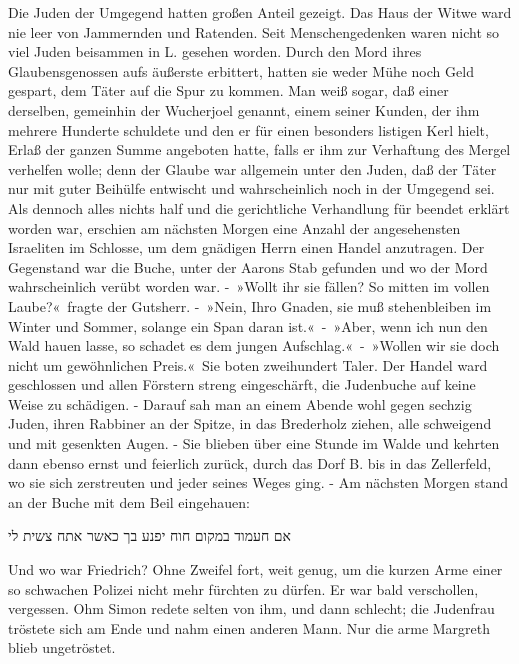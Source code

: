 Die Juden der Umgegend hatten großen Anteil gezeigt. Das Haus der Witwe ward nie leer von Jammernden und Ratenden. Seit Menschengedenken waren nicht so viel Juden beisammen in L. gesehen worden. Durch den Mord ihres Glaubensgenossen aufs äußerste erbittert, hatten sie weder Mühe noch Geld gespart, dem Täter auf die Spur zu kommen. Man weiß sogar, daß einer derselben, gemeinhin der Wucherjoel genannt, einem seiner Kunden, der ihm mehrere Hunderte schuldete und den er für einen besonders listigen Kerl hielt, Erlaß der ganzen Summe angeboten hatte, falls er ihm zur Verhaftung des Mergel verhelfen wolle; denn der Glaube war allgemein unter den Juden, daß der Täter nur mit guter Beihülfe entwischt und wahrscheinlich noch in der Umgegend sei. Als dennoch alles nichts half und die gerichtliche Verhandlung für beendet erklärt worden war, erschien am nächsten Morgen eine Anzahl der angesehensten Israeliten im Schlosse, um dem gnädigen Herrn einen Handel anzutragen. Der Gegenstand war die Buche, unter der Aarons Stab gefunden und wo der Mord wahrscheinlich verübt worden war. - »Wollt ihr sie fällen? So mitten im vollen Laube?« fragte der Gutsherr. - »Nein, Ihro Gnaden, sie muß stehenbleiben im Winter und Sommer, solange ein Span daran ist.« - »Aber, wenn ich nun den Wald hauen lasse, so schadet es dem jungen Aufschlag.« - »Wollen wir sie doch nicht um gewöhnlichen Preis.« Sie boten zweihundert Taler. Der Handel ward geschlossen und allen Förstern streng eingeschärft, die Judenbuche auf keine Weise zu schädigen. - Darauf sah man an einem Abende wohl gegen sechzig Juden, ihren Rabbiner an der Spitze, in das Brederholz ziehen, alle schweigend und mit gesenkten Augen. - Sie blieben über eine Stunde im Walde und kehrten dann ebenso ernst und feierlich zurück, durch das Dorf B. bis in das Zellerfeld, wo sie sich zerstreuten und jeder seines Weges ging. - Am nächsten Morgen stand an der Buche mit dem Beil eingehauen:

אם חעמוד במקום חוח יפנע בך כאשר אתח צשית לי

Und wo war Friedrich? Ohne Zweifel fort, weit genug, um die kurzen Arme einer so schwachen Polizei nicht mehr fürchten zu dürfen. Er war bald verschollen, vergessen. Ohm Simon redete selten von ihm, und dann schlecht; die Judenfrau tröstete sich am Ende und nahm einen anderen Mann. Nur die arme Margreth blieb ungetröstet.

